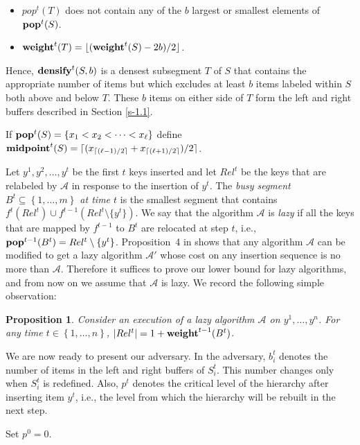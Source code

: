 \documentclass[11pt]{article}
\newtheorem{proposition}[theorem]{Proposition}
\newcommand{\A}{\mathcal{A}}
\newcommand{\natInt}[2]{ \left\{ #1, \dotsc, #2 \right\} }
\newcommand{\pop}{{\rm {\bf pop}}}
\newcommand{\weight}{{\rm {\bf weight}}}
\newcommand{\midp}{{\rm {\bf midpoint}}}
\newcommand{\densify}{{\rm {\bf densify}}}
\begin{document}
\begin{itemize}
\item $pop^t(T)$ does not contain any of the  $b$ largest or smallest elements of $\pop^t(S)$.
\item  $\weight^t(T)=\lfloor (\weight^t(S)-2b)/2 \rfloor$.
\end{itemize} 

Hence, $\densify^t(S,b)$ is a densest subsegment $T$ of $S$ that contains 
the appropriate number of items but which excludes at least $b$ items labeled within $S$ both above and below $T$.
These $b$ items on either side of $T$ form the left and right buffers described in Section \ref{s-1.1}.

If $\pop^t(S)=\{x_1<x_2 < \dotsb <x_\ell\}$ define $\midp^t(S)= \lceil (x_{\lceil (\ell-1)/2 \rceil} + x_{\lceil (\ell+1)/2 \rceil} )/ 2 \rceil$.

Let $y^1,y^2,\dotsc,y^t$ be the first $t$ keys inserted  and let $Rel^t$ be the keys
that are relabeled by
$\A$ in response to the insertion of $y^t$. The \emph{busy segment $B^t\subseteq \natInt{1}{m}$ at time $t$} is
the smallest segment that contains $f^t(Rel^t)\cup f^{t-1}(Rel^t \setminus \{y^t\})$.
We say that the algorithm $\A$ is \emph{lazy} if
all the keys that are mapped by $f^{t-1}$ to $B^t$ are relocated at step $t$, i.e., $\pop^{t-1}(B^t) = Rel^t \setminus \{y^t\}$.
Proposition~4 in \cite{BKS} shows that any algorithm $\A$ can be modified to get a lazy algorithm $\A'$
whose cost on any insertion sequence is no more than $\A$.  Therefore it suffices to prove our lower bound
for lazy algorithms, and from now on we assume that  $\A$ is lazy.
We record the following simple observation:

\begin{proposition}
\label{l-busy}
Consider an execution of a lazy algorithm $\A$ on $y^1,\ldots,y^n$.  
For any
time $t\in \natInt{1}{n}$, $|Rel^t|=1+\weight^{t-1}(B^t)$.
\end{proposition}

We are now ready to present our adversary. In the adversary, $b^t_i$ denotes the number of items in the left and right buffers
of $S^t_i$. This number changes only when $S^t_i$ is redefined. Also, $p^t$ denotes the critical level of the hierarchy
after inserting item $y^t$, i.e., the level from which the hierarchy will be rebuilt in the next step.
 

\medskip\noindent {\bf Adversary($\A,n,m,r$)}

\smallskip\noindent Set $p^0=0$.
\end{document}
